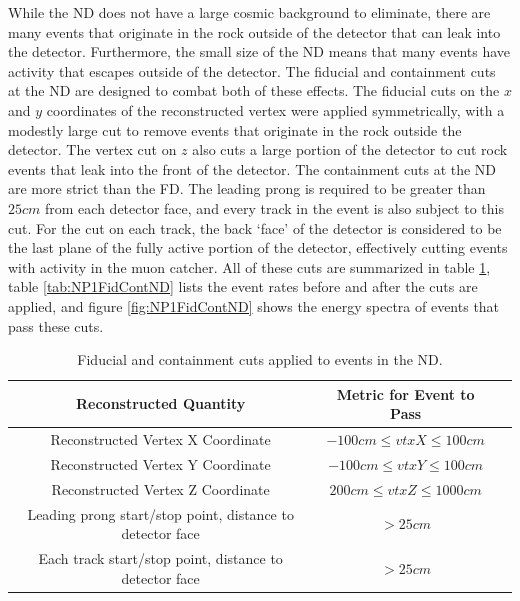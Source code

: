 While the ND does not have a large cosmic background to eliminate, there are many events that originate in the rock outside of the detector that can leak into the detector. Furthermore, the small size of the ND means that many events have activity that escapes outside of the detector. The fiducial and containment cuts at the ND are designed to combat both of these effects. The fiducial cuts on the $x$ and $y$ coordinates of the reconstructed vertex were applied symmetrically, with a modestly large cut to remove events that originate in the rock outside the detector. The vertex cut on $z$ also cuts a large portion of the detector to cut rock events that leak into the front of the detector. The containment cuts at the ND are more strict than the FD. The leading prong is required to be greater than $25\unit{cm}$ from each detector face, and every track in the event is also subject to this cut. For the cut on each track, the back `face' of the detector is considered to be the last plane of the fully active portion of the detector, effectively cutting events with activity in the muon catcher. All of these cuts are summarized in table \ref{tab:FidContND}, table \ref{tab:NP1FidContND} lists the event rates before and after the cuts are applied, and figure \ref{fig:NP1FidContND} shows the energy spectra of events that pass these cuts.
\begin{table}[htb]
  \begin{center}
    \caption[ND Fiducial and Containment Cuts]{Fiducial and containment cuts applied to events in the ND.}
    \label{tab:FidContND}
    \begin{tabular}{c c c}
      \hline\hline
      Reconstructed Quantity & Metric for Event to Pass \\
      \hline
      Reconstructed Vertex X Coordinate & $-100\unit{cm} \leq vtxX \leq 100\unit{cm} $ \\
      Reconstructed Vertex Y Coordinate & $-100\unit{cm} \leq vtxY \leq 100\unit{cm}$ \\
      Reconstructed Vertex Z Coordinate & $200\unit{cm} \leq vtxZ \leq 1000\unit{cm}$ \\
      Leading prong start/stop point, distance to detector face & $> 25\unit{cm}$ \\
      Each track start/stop point, distance to detector face & $> 25\unit{cm}$ \\
      \hline
    \end{tabular}
  \end{center}
\end{table}

